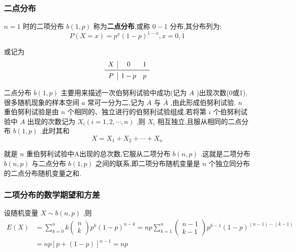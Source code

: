 \subsubsection{二点分布}

 $ n=1 $ 时的二项分布 $ b(1,p) $ 称为\textbf{二点分布},或称 $ 0-1 $ 分布,其分布列为:
\begin{equation}
P(X=x)=p^{x}(1-p)^{1-x}, x=0,1 \label{eq:2.4.2}
\end{equation}

或记为
\[
\begin{array}{c|cc}
X     & 0     & 1 \\\midrule
P     & 1-p   & p \\
\end{array}
\]

二点分布 $ b(1,p) $ 主要用来描述一次伯努利试验中成功(记为 $ A $ )出现次数(0或1).
很多随机现象的样本空间 $ a $ 常可一分为二,记为 $ A $ 与 $ \bar{A} $ ,由此形成伯努利试验. $ n $ 重伯努利试验是由 $ n $ 个相同的、独立进行的伯努利试验组成,若将第 $ i $ 个伯努利试验中 $ A $ 出现的次数记为 $ X_{i}(i=1,2, \cdots, n) $ ,则 $ X_i $ 相互独立,且服从相同的二点分布 $ b(1,p) $ .此时其和
\[
X=X_{1}+X_{2}+\cdots+X_{n}
\]

就是 $ n $ 重伯努利试验中A出现的总次数,它服从二项分布 $ b(n,p) $ .这就是二项分布 $ b(n,p) $ 与二点分布 $ b(1,p) $ 之间的联系,即二项分布随机变量是 $ n $ 个独立同分布的二点分布随机变量之和.

\subsubsection{二项分布的数学期望和方差}

设随机变量 $ X \sim b(n, p) $ ,则
\[
\begin{aligned} E(X) &=\sum_{k=0}^{n} k \left( \begin{array}{c}{n} \\ {k}\end{array}\right) p^{k}(1-p)^{n-k}=n p \sum_{k=1}^{n} \left( \begin{array}{c}{n-1} \\ {k-1}\end{array}\right) p^{k-1}(1-p)^{(n-1)-(k-1)} \\ &=n p[p+(1-p)]^{n-1}=n p \end{aligned}
\]

